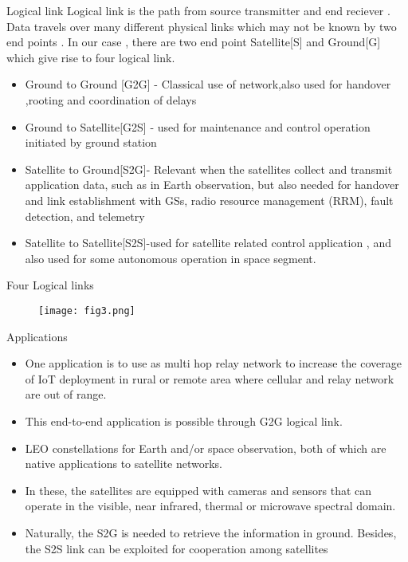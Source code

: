 \documentclass{beamer}
\begin{document}
\begin{frame}
\begin{block}{Logical link}
    Logical link is the path from source transmitter and end reciever . Data travels over many different physical links which may not be known by two end points . In our case , there are two end point Satellite[S] and Ground[G] which give rise to four logical link.
    \begin{itemize}
        \item Ground to Ground [G2G] - Classical use of network,also used for handover ,rooting and coordination of delays 
        \item Ground to Satellite[G2S] - used for maintenance and control operation initiated by ground station
        \item Satellite to Ground[S2G]- Relevant when the satellites
collect and transmit application data, such as in Earth observation, but also needed for handover and link establishment with GSs, radio resource management (RRM), fault detection, and telemetry
        \item Satellite to Satellite[S2S]-used for satellite related control application , and also used for some autonomous operation in space segment.
    \end{itemize}
\end{block}
\end{frame}

\begin{frame}{Four Logical links}
\begin{figure}
    \centering
    \texttt{[image: fig3.png]}
\end{figure}
\end{frame}

\begin{frame}{Applications}

\begin{itemize}
        \item One application is to use as multi hop relay network to increase the coverage of IoT deployment in rural or remote area where cellular and relay network are out of range.
        \item This end-to-end application is possible through G2G logical link. 
    \item LEO constellations for Earth and/or
space observation, both of which are native applications to
satellite networks. 
\item In these, the satellites are equipped with
cameras and sensors that can operate in the visible, near infrared,
thermal or microwave spectral domain. 
\item Naturally,
the S2G is needed to retrieve the information in ground.
Besides, the S2S link can be exploited for cooperation
among satellites
\end{itemize}
\end{frame}
\end{document}
